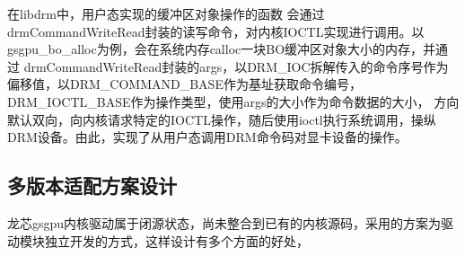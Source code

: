 在libdrm中，用户态实现的缓冲区对象操作的函数
会通过drmCommandWriteRead封装的读写命令，对内核IOCTL实现进行调用。以gsgpu\_bo\_alloc为例，会在系统内存calloc一块BO缓冲区对象大小的内存，并通过
drmCommandWriteRead封装的args，以DRM\_IOC拆解传入的命令序号作为偏移值，以DRM\_COMMAND\_BASE作为基址获取命令编号，DRM\_IOCTL\_BASE作为操作类型，使用args的大小作为命令数据的大小，
方向默认双向，向内核请求特定的IOCTL操作，随后使用ioctl执行系统调用，操纵DRM设备。由此，实现了从用户态调用DRM命令码对显卡设备的操作。


\subsection{多版本适配方案设计}
龙芯gsgpu内核驱动属于闭源状态，尚未整合到已有的内核源码，采用的方案为驱动模块独立开发的方式，这样设计有多个方面的好处，

